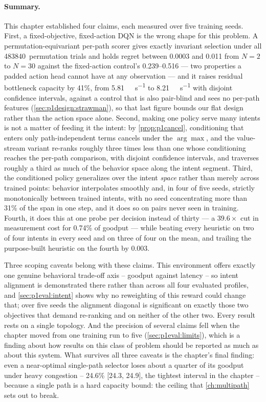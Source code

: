 \paragraph{Summary.} This chapter established four claims, each measured over five training seeds. First,
a fixed-objective, fixed-action DQN is the wrong shape for this problem. A permutation-equivariant
per-path scorer gives exactly invariant selection under all 483840~permutation trials and holds regret
between 0.0003 and 0.011 from $N = 2$ to $N = 30$ against the fixed-action control's 0.239--0.516 --- two
properties a padded action head cannot have at any observation --- and it raises residual bottleneck
capacity by
41\%, from \SI{5.81}{\giga\bit\per\second} to \SI{8.21}{\giga\bit\per\second} with disjoint confidence
intervals, against a control that is also pair-blind and sees no per-path features
(\cref{sec:p1design:strawman}), so that last figure bounds our flat design rather than the action space
alone. Second, making one policy serve many intents is not a matter of feeding it the intent:
by \cref{prop:p1cancel}, conditioning that enters only path-independent terms cancels under the
$\arg\max$, and the value-stream variant re-ranks roughly three times less than one whose conditioning
reaches the per-path comparison, with disjoint confidence intervals, and traverses roughly a third as much
of the behavior space along the intent segment. Third, the conditioned policy generalizes over the intent
\emph{space} rather than merely across trained points: behavior interpolates smoothly and, in four of
five seeds, strictly monotonically between trained intents, with no seed concentrating more than 31\% of
the span in one step, and it does so on pairs never seen in training. Fourth, it does this at one probe
per decision instead of thirty --- a $39.6\times$ cut in measurement cost for 0.74\% of goodput --- while
beating every heuristic on two of four intents in every seed and on three of four on the mean, and
trailing the purpose-built heuristic on the fourth by 0.003.

Three scoping caveats belong with these claims. This environment offers exactly one genuine behavioral
trade-off axis -- goodput against latency -- so intent alignment is demonstrated there rather than across
all four evaluated profiles, and \cref{sec:p1eval:intent} shows why no reweighting of this reward could
change that; over five seeds the alignment diagonal is significant on exactly those two objectives that
demand re-ranking and on neither of the other two. Every result rests on a single topology. And the
precision of several claims fell when the chapter moved from one training run to five
(\cref{sec:p1eval:limits}), which is a finding about how results on this class of problem should be
reported as much as about this system. What survives all three caveats is the chapter's
final finding: even a near-optimal single-path selector loses about a quarter of its goodput under heavy
congestion -- 24.6\% [24.3, 24.9], the tightest interval in the chapter -- because a single path is a
hard capacity bound: the ceiling that \cref{ch:multipath} sets out to break.
